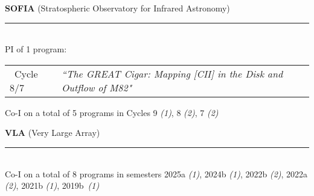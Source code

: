\documentclass[11pt]{article}
\makeatletter
\def\vhrulefill#1{\leavevmode\leaders\hrule\@height#1\hfill \kern\z@}
\makeatother
\begin{document}

{\bf SOFIA} {\small (Stratospheric Observatory for Infrared Astronomy)} \vhrulefill{0.5pt}\\
{PI of 1 program:}
\vspace{-9pt}
\begin{longtable}{p{}p{}}
\ Cycle 8/7 & \textit{``The GREAT Cigar: Mapping [CII] in the Disk and Outflow of M82"}\\
\end{longtable}
\vspace{-18pt}
Co-I on a total of 5 programs in Cycles 9 {\em(1)}, 8 {\em(2)}, 7 {\em(2)}\medskip


{\bf VLA} {\small (Very Large Array)} \vhrulefill{0.5pt}\\
Co-I on a total of 8 programs in semesters 2025a {\em(1)}, 2024b {\em(1)}, 2022b {\em(2)}, 2022a {\em(2)}, 2021b {\em(1)}, 2019b~{\em(1)}\medskip
\end{document}
